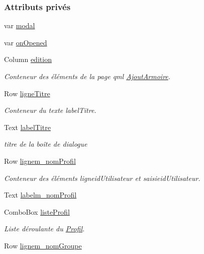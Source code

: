\subsubsection*{Attributs privés}
\begin{DoxyCompactItemize}
\item 
var \hyperlink{class_ajout_utilisateur_a8c38ba1093c887634052e8f6f42cdba5}{modal}
\item 
var \hyperlink{class_ajout_utilisateur_acbcad26cc2a2e9a3836663a1840af371}{on\+Opened}
\item 
Column \hyperlink{class_ajout_utilisateur_a872f43e9507949379239c0f937f15c58}{edition}
\begin{DoxyCompactList}\small\item\em Conteneur des éléments de la page qml \hyperlink{class_ajout_armoire}{Ajout\+Armoire}. \end{DoxyCompactList}\item 
Row \hyperlink{class_ajout_utilisateur_af2732d5d87888244023489c5e5428ba2}{ligne\+Titre}
\begin{DoxyCompactList}\small\item\em Conteneur du texte label\+Titre. \end{DoxyCompactList}\item 
Text \hyperlink{class_ajout_utilisateur_a3f825d5f97e4249dcfbf33e0ae675c4b}{label\+Titre}
\begin{DoxyCompactList}\small\item\em titre de la boîte de dialogue \end{DoxyCompactList}\item 
Row \hyperlink{class_ajout_utilisateur_a112cc5f48e449898694c78bc7ee65056}{lignem\+\_\+nom\+Profil}
\begin{DoxyCompactList}\small\item\em Conteneur des éléments ligneid\+Utilisateur et saisieid\+Utilisateur. \end{DoxyCompactList}\item 
Text \hyperlink{class_ajout_utilisateur_accd5a1444bb7c14c9d5d4f7da1a39343}{labelm\+\_\+nom\+Profil}
\item 
Combo\+Box \hyperlink{class_ajout_utilisateur_a7fbe5e2339ad0311d535d68af2d5575d}{liste\+Profil}
\begin{DoxyCompactList}\small\item\em Liste déroulante du \hyperlink{class_profil}{Profil}. \end{DoxyCompactList}\item 
Row \hyperlink{class_ajout_utilisateur_a176cdbe0805210856f133d7248ac612d}{lignem\+\_\+nom\+Groupe}

\end{DoxyCompactItemize}
